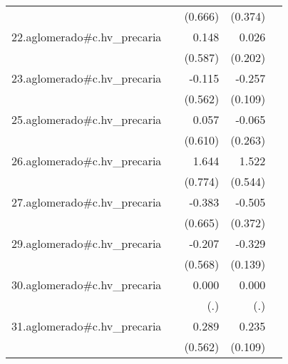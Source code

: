 {\begin{longtable}{l*{4}{D{.}{.}{-1}}}
            &                     &     (0.666)         &     (0.374)         &                     \\
\addlinespace
22.aglomerado#c.hv\_precaria&                     &       0.148         &       0.026         &                     \\
            &                     &     (0.587)         &     (0.202)         &                     \\
\addlinespace
23.aglomerado#c.hv\_precaria&                     &      -0.115         &      -0.257\sym{*}  &                     \\
            &                     &     (0.562)         &     (0.109)         &                     \\
\addlinespace
25.aglomerado#c.hv\_precaria&                     &       0.057         &      -0.065         &                     \\
            &                     &     (0.610)         &     (0.263)         &                     \\
\addlinespace
26.aglomerado#c.hv\_precaria&                     &       1.644\sym{*}  &       1.522\sym{**} &                     \\
            &                     &     (0.774)         &     (0.544)         &                     \\
\addlinespace
27.aglomerado#c.hv\_precaria&                     &      -0.383         &      -0.505         &                     \\
            &                     &     (0.665)         &     (0.372)         &                     \\
\addlinespace
29.aglomerado#c.hv\_precaria&                     &      -0.207         &      -0.329\sym{*}  &                     \\
            &                     &     (0.568)         &     (0.139)         &                     \\
\addlinespace
30.aglomerado#c.hv\_precaria&                     &       0.000         &       0.000         &                     \\
            &                     &         (.)         &         (.)         &                     \\
\addlinespace
31.aglomerado#c.hv\_precaria&                     &       0.289         &       0.235\sym{*}  &                     \\
            &                     &     (0.562)         &     (0.109)         &                     \\

\end{longtable}}
